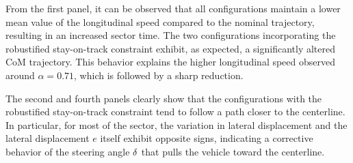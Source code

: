 From the first panel, it can be observed that all configurations maintain a lower mean value of the longitudinal speed compared to the nominal trajectory, resulting in an increased sector time. The two configurations incorporating the robustified stay-on-track constraint exhibit, as expected, a significantly altered CoM trajectory. This behavior explains the higher longitudinal speed observed around $\alpha = 0.71$, which is followed by a sharp reduction.

The second and fourth panels clearly show that the configurations with the robustified stay-on-track constraint tend to follow a path closer to the centerline. In particular, for most of the sector, the variation in lateral displacement and the lateral displacement $e$ itself exhibit opposite signs, indicating a corrective behavior of the steering angle $\delta$ that pulls the vehicle toward the centerline.
